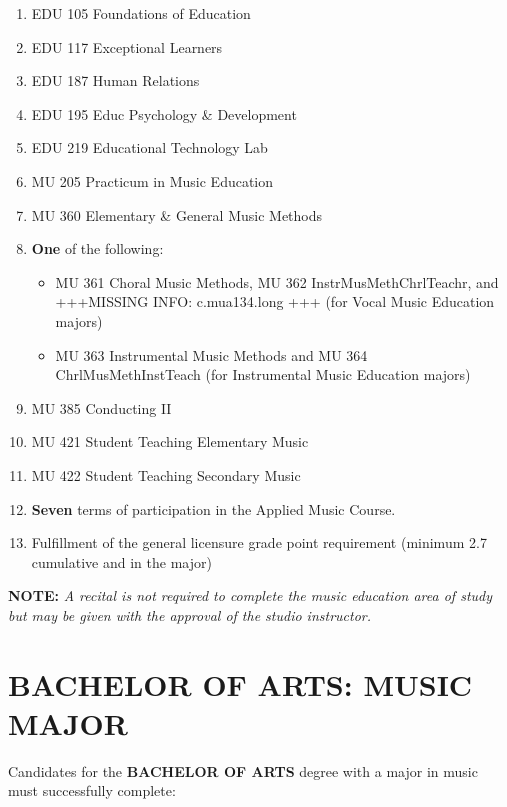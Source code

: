 \documentclass[
  letterpaper,
]{scrbook}
\providecommand{\tightlist}{%
  \setlength{\itemsep}{0pt}\setlength{\parskip}{0pt}}
\begin{document}
\begin{enumerate}
  \begin{enumerate}
  \def\labelenumii{\arabic{enumii}.}
  \tightlist
  \item
    EDU 105 Foundations of Education
  \item
    EDU 117 Exceptional Learners
  \item
    EDU 187 Human Relations
  \item
    EDU 195 Educ Psychology \& Development
  \item
    EDU 219 Educational Technology Lab
  \item
    MU 205 Practicum in Music Education
  \item
    MU 360 Elementary \& General Music Methods
  \item
    \textbf{One} of the following:

    \begin{itemize}
    \tightlist
    \item
      MU 361 Choral Music Methods, MU 362 InstrMusMethChrlTeachr, and
      +++MISSING INFO: c.mua134.long +++ (for Vocal Music Education
      majors)
    \item
      MU 363 Instrumental Music Methods and MU 364 ChrlMusMethInstTeach
      (for Instrumental Music Education majors)
    \end{itemize}
  \item
    MU 385 Conducting II
  \item
    MU 421 Student Teaching Elementary Music
  \item
    MU 422 Student Teaching Secondary Music
  \item
    \textbf{Seven} terms of participation in the Applied Music Course.
  \item
    Fulfillment of the general licensure grade point requirement
    (minimum 2.7 cumulative and in the major)
  \end{enumerate}
\end{enumerate}

\textbf{NOTE:} \emph{A recital is not required to complete the music
education area of study but may be given with the approval of the studio
instructor. }

\section{BACHELOR OF ARTS: MUSIC
MAJOR}\label{bachelor-of-arts-music-major}

Candidates for the \textbf{BACHELOR OF ARTS} degree with a major in
music must successfully complete:
\end{document}
